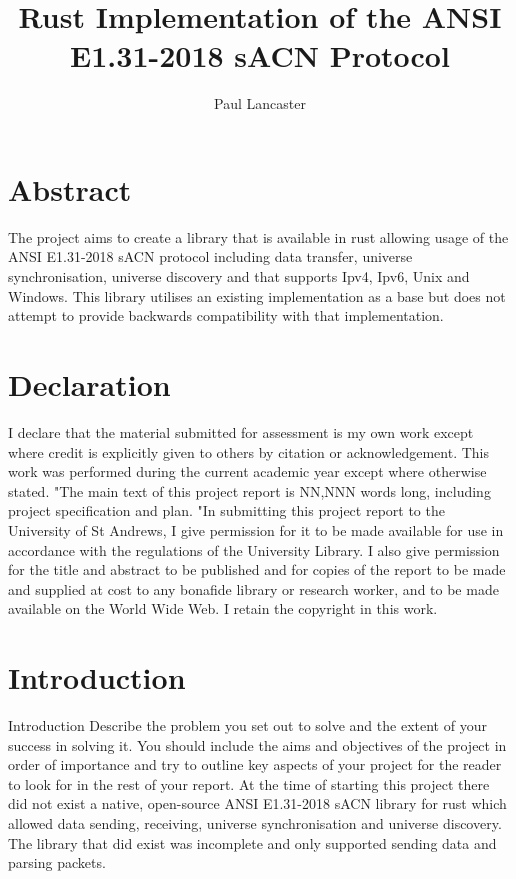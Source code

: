 \documentclass[11pt,a4paper]{report}
\author{Paul Lancaster}
\title{Rust Implementation of the ANSI E1.31-2018 sACN Protocol}
\begin{document}
	
	
	\section{Abstract}
	The project aims to create a library that is available in rust allowing usage of the ANSI E1.31-2018 sACN \cite{ANSI_E1.31} protocol including data transfer, universe synchronisation, universe discovery and that supports Ipv4, Ipv6, Unix and Windows. This library utilises an existing implementation \cite{ORIGINAL_IMPL} as a base but does not attempt to provide backwards compatibility with that implementation.
	
	\section{Declaration}
	I declare that the material submitted for
	assessment is my own work except where credit is
	explicitly given to others by citation or
	acknowledgement. This work was performed during
	the current academic year except where otherwise
	stated.
	"The main text of this project report is NN,NNN
	words long, including project specification and plan.
	"In submitting this project report to the University of
	St Andrews, I give permission for it to be made
	available for use in accordance with the regulations of the University Library. I also give permission for
	the title and abstract to be published and for copies of the report to be made and supplied at cost to any bonafide library or research worker, and to be made
	available on the World Wide Web. I retain the
	copyright in this work.
	
	
	\tableofcontents
	\pagebreak
	
\section{Introduction}
		Introduction
		Describe the problem you set out to solve and the
		extent of your success in solving it. You should include
		the aims and objectives of the project in order of
		importance and try to outline key aspects of your
		project for the reader to look for in the rest of your
		report.
	At the time of starting this project there did not exist a native, open-source ANSI E1.31-2018 sACN library for rust which allowed data sending, receiving, universe synchronisation and universe discovery.  The library that did exist was incomplete and only supported sending data and parsing packets.\\
	
\end{document}
